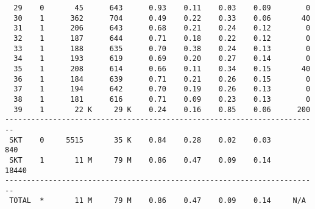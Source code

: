 \begin{lstlisting}
  29    0       45      643      0.93    0.11    0.03    0.09        0
  30    1      362      704      0.49    0.22    0.33    0.06       40
  31    1      206      643      0.68    0.21    0.24    0.12        0
  32    1      187      644      0.71    0.18    0.22    0.12        0
  33    1      188      635      0.70    0.38    0.24    0.13        0
  34    1      193      619      0.69    0.20    0.27    0.14        0
  35    1      208      614      0.66    0.11    0.34    0.15       40
  36    1      184      639      0.71    0.21    0.26    0.15        0
  37    1      194      642      0.70    0.19    0.26    0.13        0
  38    1      181      616      0.71    0.09    0.23    0.13        0
  39    1       22 K     29 K    0.24    0.16    0.85    0.06      200
------------------------------------------------------------------------
 SKT    0     5515       35 K    0.84    0.28    0.02    0.03       840
 SKT    1       11 M     79 M    0.86    0.47    0.09    0.14     18440
------------------------------------------------------------------------
 TOTAL  *       11 M     79 M    0.86    0.47    0.09    0.14     N/A
\end{lstlisting}
